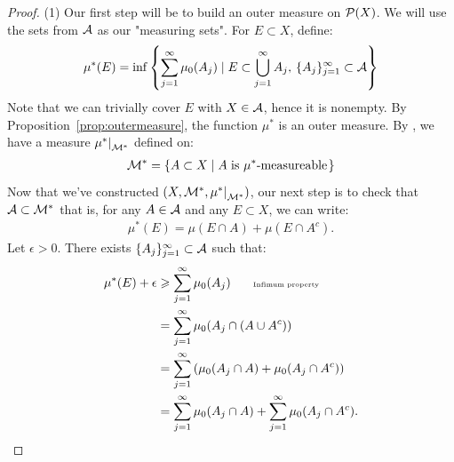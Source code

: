         \begin{proof}
            (1) Our first step will be to build an outer measure on $\cP(X)$. We will use the sets from $\cA$ as our "measuring sets". For $E \subset X$, define:
                \begin{equation*}
                \begin{split}
                    \mu^\ast(E) = \inf \left\{ \sum_{j = 1}^\infty \mu_0 (A_j) \mid E \subset \bigcup_{j = 1}^\infty A_j,\h2 \{A_j\}_{j = 1}^\infty \subset \cA \right\}
                \end{split}
                \end{equation*}
            Note that we can trivially cover $E$ with $X \in \cA$, hence it is nonempty. By Proposition~\ref{prop:outermeasure}, the function $\mu^\ast$ is an outer measure. By , we have a measure $\restr{\mu^\ast}{\cM^\ast}$ defined on:
                \begin{equation*}
                \begin{split}
                    \cM^\ast = \{A \subset X \mid A \h3\text{is $\mu^\ast$-measureable}\h1\}
                \end{split}
                \end{equation*}
            Now that we've constructed $(X,\cM^\ast,\restr{\mu^\ast}{\cM^\ast})$, our next step is to check that $\cA \subset \cM^\ast$ \textemdash that is, for any $A \in \cA$ and any $E \subset X$, we can write:
                \begin{equation*}
                \begin{split}
                    \mu^\ast(E) = \mu(E \cap A) + \mu(E \cap A^c).
                \end{split}
                \end{equation*}
            Let $\epsilon > 0$. There exists $\{A_j\}_{j = 1}^\infty \subset \cA$ such that:
                \begin{equation*}
                \begin{split}
                    \mu^\ast(E) + \epsilon 
                    & \geq \sum_{j = 1}^\infty \mu_0(A_j) \h9\h9\text{\tiny Infimum property} \\
                    & = \sum_{j = 1}^\infty \mu_0(A_j \cap (A \cup A^c)) \\ 
                    & = \sum_{j = 1}^\infty \left( \mu_0(A_j \cap A) + \mu_0 (A_j \cap A^c) \right) \\
                    & = \sum_{j = 1}^\infty \mu_0(A_j \cap A) + \sum_{j = 1}^\infty\mu_0 (A_j \cap A^c). \\

\end{split}
\end{equation*}
\end{proof}
